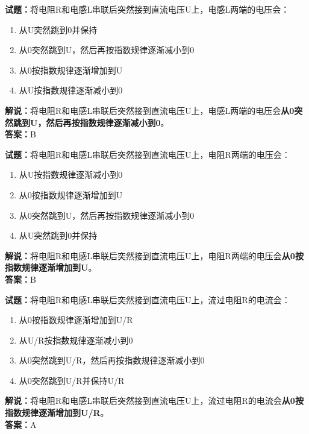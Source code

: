 \documentclass{ctexbook}
\begin{document}
\vspace{1em}

\textbf{试题：}将电阻R和电感L串联后突然接到直流电压U上，电感L两端的电压会：
\begin{enumerate}[leftmargin=3em]
  \item 从U突然跳到0并保持
  \item 从0突然跳到U，然后再按指数规律逐渐减小到0
  \item 从0按指数规律逐渐增加到U
  \item 从U按指数规律逐渐减小到0
\end{enumerate}
\noindent\textbf{解说：}将电阻R和电感L串联后突然接到直流电压U上，电感L两端的电压会\textbf{从0突然跳到U，然后再按指数规律逐渐减小到0}。\\\noindent\textbf{答案：}B

\vspace{1em}

\textbf{试题：}将电阻R和电感L串联后突然接到直流电压U上，电阻R两端的电压会：
\begin{enumerate}[leftmargin=3em]
  \item 从U按指数规律逐渐减小到0
  \item 从0按指数规律逐渐增加到U
  \item 从0突然跳到U，然后再按指数规律逐渐减小到0
  \item 从U突然跳到0并保持
\end{enumerate}
\noindent\textbf{解说：}将电阻R和电感L串联后突然接到直流电压U上，电阻R两端的电压会\textbf{从0按指数规律逐渐增加到U}。\\\noindent\textbf{答案：}B

\vspace{1em}

\textbf{试题：}将电阻R和电感L串联后突然接到直流电压U上，流过电阻R的电流会：
\begin{enumerate}[leftmargin=3em]
  \item 从0按指数规律逐渐增加到U/R
  \item 从U/R按指数规律逐渐减小到0
  \item 从0突然跳到U/R，然后再按指数规律逐渐减小到0
  \item 从0突然跳到U/R并保持U/R
\end{enumerate}
\noindent\textbf{解说：}将电阻R和电感L串联后突然接到直流电压U上，流过电阻R的电流会\textbf{从0按指数规律逐渐增加到U/R}。\\\noindent\textbf{答案：}A

\vspace{1em}
\end{document}
